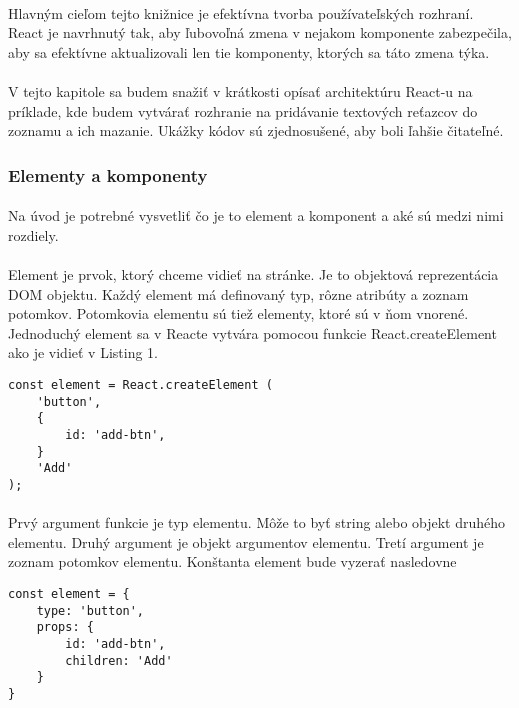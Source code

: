 \paragraph{}
Hlavným cieľom tejto knižnice je efektívna tvorba používateľských rozhraní. React je navrhnutý tak, aby ľubovoľná zmena v nejakom komponente zabezpečila, aby sa efektívne aktualizovali len tie komponenty, ktorých sa táto zmena týka.
\paragraph{}
V tejto kapitole sa budem snažiť v krátkosti opísať architektúru React-u na príklade, kde budem vytvárať rozhranie na pridávanie textových reťazcov do zoznamu a ich mazanie. Ukážky kódov sú zjednosušené, aby boli ľahšie čitateľné.


\subsubsection{Elementy a komponenty}
\paragraph{}
Na úvod je potrebné vysvetliť čo je to element a komponent a aké sú medzi nimi rozdiely. 
\paragraph{}
Element je prvok, ktorý chceme vidieť na stránke. Je to objektová reprezentácia DOM objektu. Každý element má definovaný typ, rôzne atribúty a zoznam potomkov. Potomkovia elementu sú tiež elementy, ktoré sú v ňom vnorené. Jednoduchý element sa v Reacte vytvára pomocou funkcie React.createElement ako je vidieť v Listing 1.
\begin{lstlisting}[caption=Vytvorenie jednoduchého elementu]
const element = React.createElement (
    'button',
    {
        id: 'add-btn',
    }
    'Add'
);
\end{lstlisting}
\paragraph{}
Prvý argument funkcie je typ elementu. Môže to byť string alebo objekt druhého elementu. Druhý argument je objekt argumentov elementu. Tretí argument je zoznam potomkov elementu. Konštanta element bude vyzerať nasledovne
\begin{lstlisting}
const element = {
    type: 'button',
    props: {
        id: 'add-btn',
        children: 'Add'
    }
}
\end{lstlisting}
